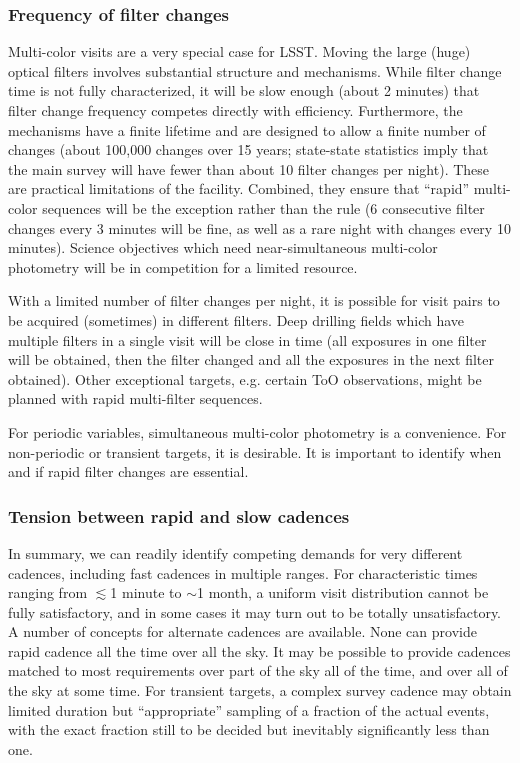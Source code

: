 \subsubsection{Frequency of filter changes}

Multi-color visits are a very special case for LSST.  Moving the large
(huge) optical filters involves substantial structure and mechanisms.
While filter change time is not fully characterized, it will be slow
enough (about 2 minutes) that filter change frequency competes directly
with efficiency. Furthermore, the mechanisms have a finite lifetime and
are designed to allow a finite number of changes (about 100,000 changes
over 15 years; state-state statistics imply that the main survey will
have fewer than about 10 filter changes per night). These are practical
limitations of the facility. Combined, they ensure that ``rapid''
multi-color sequences will be the exception rather than the rule (6
consecutive filter changes every 3 minutes will be fine, as well as a
rare night with changes every 10 minutes). Science objectives which need
near-simultaneous multi-color photometry will be in competition for a
limited resource.

With a limited number of filter changes per night, it is possible for
visit pairs to be acquired (sometimes) in different filters.  Deep
drilling fields which have multiple filters in a single visit will be
close in time (all exposures in one filter will be obtained, then the
filter changed and all the exposures in the next filter obtained).
Other exceptional targets, e.g. certain ToO observations, might be
planned with rapid multi-filter sequences.

For periodic variables, simultaneous multi-color photometry is a
convenience.  For non-periodic or transient targets, it is desirable. It
is important to identify when and if rapid filter changes are essential.


\subsubsection{Tension between rapid and slow cadences}

In summary, we can readily identify competing demands for very different
cadences, including fast cadences in multiple ranges. For characteristic
times ranging from  $\lesssim$1 minute to $\sim$1 month, a uniform visit
distribution cannot be fully satisfactory, and in some cases it may turn
out to be totally unsatisfactory.  A number of concepts for alternate
cadences are available.  None can provide rapid cadence all the time
over all the sky. It may be possible to provide cadences matched to most
requirements over part of the sky all of the time, and over all of the
sky at some time. For transient targets, a complex survey cadence may
obtain limited duration but ``appropriate'' sampling of a fraction of
the actual events, with the exact fraction still to be decided but
inevitably significantly less than one.

